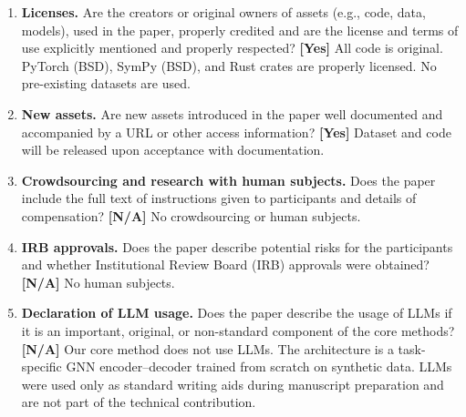 \documentclass{article}
\begin{document}
\begin{enumerate}
\item \textbf{Licenses.}
Are the creators or original owners of assets (e.g., code, data, models), used in the paper, properly credited and are the license and terms of use explicitly mentioned and properly respected?
\textbf{[Yes]} All code is original. PyTorch (BSD), SymPy (BSD), and Rust crates are properly licensed. No pre-existing datasets are used.

\item \textbf{New assets.}
Are new assets introduced in the paper well documented and accompanied by a URL or other access information?
\textbf{[Yes]} Dataset and code will be released upon acceptance with documentation.

\item \textbf{Crowdsourcing and research with human subjects.}
Does the paper include the full text of instructions given to participants and details of compensation?
\textbf{[N/A]} No crowdsourcing or human subjects.

\item \textbf{IRB approvals.}
Does the paper describe potential risks for the participants and whether Institutional Review Board (IRB) approvals were obtained?
\textbf{[N/A]} No human subjects.

\item \textbf{Declaration of LLM usage.}
Does the paper describe the usage of LLMs if it is an important, original, or non-standard component of the core methods?
\textbf{[N/A]} Our core method does not use LLMs. The architecture is a task-specific GNN encoder--decoder trained from scratch on synthetic data. LLMs were used only as standard writing aids during manuscript preparation and are not part of the technical contribution.

\end{enumerate}
\end{document}
